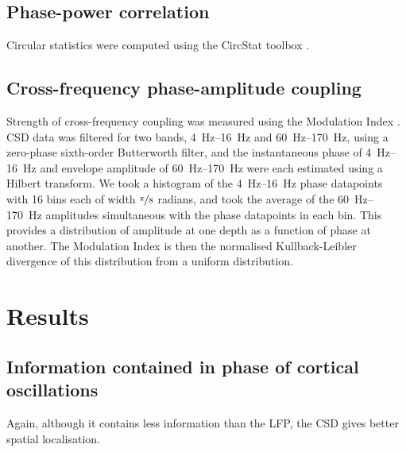 \subsection{Phase-power correlation}

Circular statistics were computed using the CircStat toolbox \citep{Berens2009}.


\subsection{Cross-frequency phase-amplitude coupling}

Strength of cross-frequency coupling was measured using the Modulation Index \citep{Tort2010}.
\ac{CSD} data was filtered for two bands, \SIrange{4}{16}{Hz} and \SIrange{60}{170}{Hz}, using a zero-phase sixth-order Butterworth filter, and the instantaneous phase of \SIrange{4}{16}{Hz} and envelope amplitude of \SIrange{60}{170}{Hz} were each estimated using a Hilbert transform.
We took a histogram of the \SIrange{4}{16}{Hz} phase datapoints with \num{16} bins each of width $\nicefrac{\pi}{8}$ radians, and took the average of the \SIrange{60}{170}{Hz} amplitudes simultaneous with the phase datapoints in each bin.
This provides a distribution of amplitude at one depth as a function of phase at another.
The Modulation Index is then the normalised Kullback-Leibler divergence of this distribution from a uniform distribution.


\section{Results}


\FloatBarrier
\subsection{Information contained in phase of cortical oscillations}

Again, although it contains less information than the \ac{LFP}, the \ac{CSD} gives better spatial localisation.

